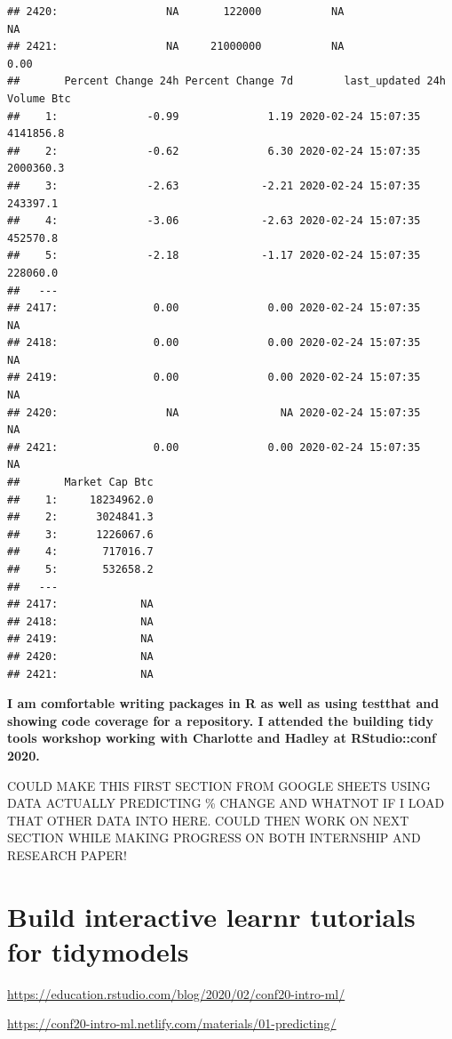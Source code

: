 \documentclass[
]{book}
\begin{document}
\begin{verbatim}
## 2420:                 NA       122000           NA                NA
## 2421:                 NA     21000000           NA              0.00
##       Percent Change 24h Percent Change 7d        last_updated 24h Volume Btc
##    1:              -0.99              1.19 2020-02-24 15:07:35      4141856.8
##    2:              -0.62              6.30 2020-02-24 15:07:35      2000360.3
##    3:              -2.63             -2.21 2020-02-24 15:07:35       243397.1
##    4:              -3.06             -2.63 2020-02-24 15:07:35       452570.8
##    5:              -2.18             -1.17 2020-02-24 15:07:35       228060.0
##   ---                                                                        
## 2417:               0.00              0.00 2020-02-24 15:07:35             NA
## 2418:               0.00              0.00 2020-02-24 15:07:35             NA
## 2419:               0.00              0.00 2020-02-24 15:07:35             NA
## 2420:                 NA                NA 2020-02-24 15:07:35             NA
## 2421:               0.00              0.00 2020-02-24 15:07:35             NA
##       Market Cap Btc
##    1:     18234962.0
##    2:      3024841.3
##    3:      1226067.6
##    4:       717016.7
##    5:       532658.2
##   ---               
## 2417:             NA
## 2418:             NA
## 2419:             NA
## 2420:             NA
## 2421:             NA
\end{verbatim}

\textbf{I am comfortable writing packages in R as well as using testthat and showing code coverage for a repository. I attended the building tidy tools workshop working with Charlotte and Hadley at RStudio::conf 2020.}

COULD MAKE THIS FIRST SECTION FROM GOOGLE SHEETS USING DATA ACTUALLY PREDICTING \% CHANGE AND WHATNOT IF I LOAD THAT OTHER DATA INTO HERE. COULD THEN WORK ON NEXT SECTION WHILE MAKING PROGRESS ON BOTH INTERNSHIP AND RESEARCH PAPER!

\hypertarget{build-interactive-learnr-tutorials-for-tidymodels}{%
\section{Build interactive learnr tutorials for tidymodels}\label{build-interactive-learnr-tutorials-for-tidymodels}}

\url{https://education.rstudio.com/blog/2020/02/conf20-intro-ml/}

\url{https://conf20-intro-ml.netlify.com/materials/01-predicting/}
\end{document}
